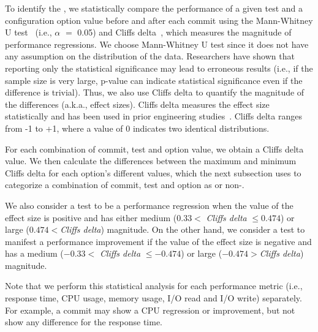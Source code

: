 To identify the \inconsistent, we statistically compare the performance of a given test and a configuration option value before and after each commit using the %
Mann-Whitney U test~\cite{nachar2008mann} %
(i.e., $\alpha$ $=$ 0.05) and Cliff\textquotesingle s delta~\cite{ES2006:Becker}, which measures the magnitude of performance regressions. We choose Mann-Whitney U test since it does not have any assumption on the distribution of the data. Researchers have shown that reporting only the statistical significance may lead to erroneous results (i.e., if the sample size is very large, p-value can indicate statistical significance even if the difference is trivial). Thus, we also use Cliff\textquotesingle s delta to quantify the magnitude of the differences (a.k.a., effect sizes). Cliff\textquotesingle s delta measures the effect size statistically and has been used in prior engineering studies~\cite{ICSE2002:Kitchenham, Liao2020LogPerfReg, DBLP:journals/ese/LiCSH18}. Cliff\textquotesingle s delta ranges from -1 to +1, where a value of 0 indicates two identical distributions.

For each combination of commit, test and option value, we obtain a Cliff\textquotesingle s delta value. We then calculate the differences between the maximum and minimum Cliff\textquotesingle s delta for each option's different values, which the next subsection uses to categorize a combination of commit, test and option as \inconsistent or non-\inconsistent.%

We also consider a test to be a performance regression when the value of the effect size is positive and has either medium ($0.33 <$ \emph{Cliff\textquotesingle s delta} $\leqslant 0.474$) or large ($0.474 < $\emph{Cliff\textquotesingle s delta}) magnitude. On the other hand, we consider a test to manifest a performance improvement if the value of the effect size is negative and has a medium ($-0.33 <$ \emph{Cliff\textquotesingle s delta} $\leqslant -0.474$) or large ($-0.474 > $\emph{Cliff\textquotesingle s delta}) magnitude. 

Note that we perform this statistical analysis for each performance metric (i.e., response time, CPU usage, memory usage, I/O read and I/O write) separately. For example, a commit may show a CPU regression or improvement, but not show any difference for the response time. 

